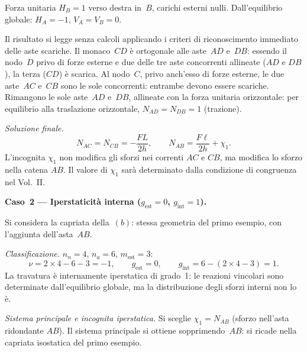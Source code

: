 \begin{esempio}
\begin{svolgimento}
		Forza unitaria $H_B = 1$ verso destra in~$B$,
		carichi esterni nulli.
		Dall'equilibrio globale: $H_A = -1$, $V_A = V_B = 0$.
		
		Il risultato si legge senza calcoli applicando i criteri
		di riconoscimento immediato delle aste scariche.
		Il monaco~$CD$ è ortogonale alle aste~$AD$ e~$DB$:
		essendo il nodo~$D$ privo di forze esterne e due delle
		tre aste concorrenti allineate ($AD$ e $DB$), la terza
		($CD$) è scarica. Al nodo~$C$, privo anch'esso di
		forze esterne, le due aste~$AC$ e~$CB$ sono le sole
		concorrenti: entrambe devono essere scariche.
		Rimangono le sole aste~$AD$ e~$DB$, allineate con la
		forza unitaria orizzontale: per equilibrio alla
		traslazione orizzontale, $N_{AD} = N_{DB} = 1$
		(trazione).
		
		\smallskip
		\noindent\textit{Soluzione finale.}
		\[
		N_{AC} = N_{CB} = -\frac{FL}{2h},
		\qquad
		N_{AB} = \frac{F\ell}{2h} + \chi_1.
		\]
		L'incognita $\chi_1$ non modifica gli sforzi
		nei correnti $AC$ e $CB$, ma modifica lo sforzo
		nella catena $AB$. Il valore di $\chi_1$
		sarà determinato dalla condizione di congruenza
		nel Vol.~II.
		
		



		
		
		\noindent\textbf{Caso~2 --- Iperstaticità interna
			($g_\text{est} = 0$, $g_\text{int} = 1$).}
		
		Si considera la capriata della \,$(b)$:
		stessa geometria del primo esempio, con l'aggiunta
		dell'asta~$AB$.
		
		\smallskip
		\noindent\textit{Classificazione.}
		$n_n = 4$, $n_a = 6$, $m_\text{est} = 3$:
		\[
		\nu = 2 \times 4 - 6 - 3 = -1,
		\qquad
		g_\text{est} = 0,
		\qquad
		g_\text{int} = 6 - (2 \times 4 - 3) = 1.
		\]
		La travatura è internamente iperstatica di grado~1:
		le reazioni vincolari sono determinate dall'equilibrio
		globale, ma la distribuzione degli sforzi interni
		non lo è.
		
		\smallskip
		\noindent\textit{Sistema principale e incognita
			iperstatica.}
		Si sceglie $\chi_1 = N_{AB}$ (sforzo nell'asta
		ridondante $AB$). Il sistema principale si ottiene
		sopprimendo~$AB$: si ricade nella capriata
		isostatica del primo esempio.
		

\end{svolgimento}
\end{esempio}

